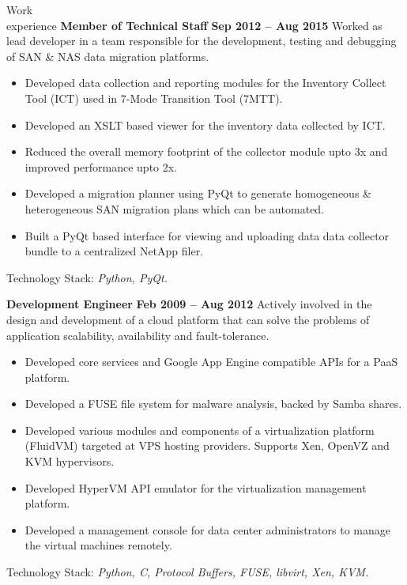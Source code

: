\documentclass{resume}
\begin{document}
\begin{category}{Work \\experience}
  \citemnobullet \textbf{Member of Technical Staff} \hfill \textbf{Sep 2012 -- Aug 2015}
  \citemnobullet Worked as lead developer in a team responsible for the development, testing and debugging of SAN \& NAS data migration platforms.
  \begin{itemize}
  \item Developed data collection and reporting modules for the Inventory Collect Tool (ICT) used in 7-Mode Transition Tool (7MTT).
  \item Developed an XSLT based viewer for the inventory data collected by ICT.
  \item Reduced the overall memory footprint of the collector module upto 3x and improved performance upto 2x.
  \item Developed a migration planner using PyQt to generate homogeneous \& heterogeneous SAN migration plans which can be automated.
  \item Built a PyQt based interface for viewing and uploading data data collector bundle to a centralized NetApp filer.
  \end{itemize}
  \citemnobullet Technology Stack: \textit{Python, PyQt.}


  \citemnobullet \textbf{Development Engineer} \hfill \textbf{Feb 2009 -- Aug 2012}
  \citemnobullet Actively involved in the design and development of a cloud platform that can solve the problems of application scalability, availability and fault-tolerance.
  \begin{itemize}
  \item Developed core services and Google App Engine compatible APIs for a PaaS platform.
  \item Developed a FUSE file system for malware analysis, backed by Samba shares.
  \item Developed various modules and components of a virtualization platform (FluidVM) targeted at VPS hosting providers. Supports Xen, OpenVZ and KVM hypervisors.
  \item Developed HyperVM API emulator for the virtualization management platform.
  \item Developed a management console for data center administrators to manage the virtual machines remotely.
  \end{itemize}
  \citemnobullet Technology Stack: \textit{Python, C, Protocol Buffers, FUSE, libvirt, Xen, KVM.}
\end{category}
\end{document}
